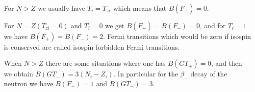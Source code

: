 \documentclass[%
twoside,                 %
final,                   %
10pt]{article}
\begin{document}
\paragraph{}
For $N > Z$ we usually have
$T_{i}=T_{zi}$ which means that $B(F_{+})=0$.

For $N=Z (T_{zi}=0)$ and $T_{i}=0$ we get 
$B(F_{+})=B(F_{-})=0$, and for $T_{i}=1$ we
have $B(F_{+}) = B(F_{-}) = 2$. Fermi transitions which would be zero
if isospin is conserved are called isospin-forbidden Fermi transitions.

When $N > Z$ there are some situations where one has $B(GT_{+})=0$,
and then we obtain $B(GT_{-}) = 3(N_{i}-Z_{i})$. In particular
for the $\beta_{-}$ decay of the neutron we have $B(F_{-})=1$
and $B(GT_{-})=3$.



























\printindex
\end{document}
